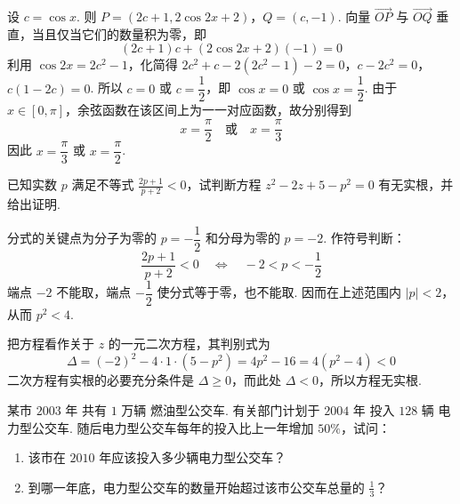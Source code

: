 \begin{solution}
设 \(c=\cos x\). 则
\(P=(2c+1,2\cos2x+2)\)，\(Q=(c,-1)\).
向量 \(\overrightarrow{OP}\) 与 \(\overrightarrow{OQ}\) 垂直，当且仅当它们的数量积为零，即
\[
(2c+1)c+(2\cos2x+2)(-1)=0
\]
利用 \(\cos2x=2c^2-1\)，化简得
\(2c^2+c-2(2c^2-1)-2=0\)，\(c-2c^2=0\)，\(c(1-2c)=0\).
所以 \(c=0\) 或 \(c=\dfrac{1}{2}\)，即 \(\cos x=0\) 或 \(\cos x=\dfrac{1}{2}\). 由于 \(x\in[0,\pi]\)，余弦函数在该区间上为一一对应函数，故分别得到
\[
x=\frac{\pi}{2}\quad\text{或}\quad x=\frac{\pi}{3}
\]
因此 \(x=\dfrac{\pi}{3}\) 或 \(x=\dfrac{\pi}{2}\).
\end{solution}

\begin{problem}
已知实数 \(p\) 满足不等式 \(\frac{2p+1}{p+2}<0\)，试判断方程 \(z^2-2z+5-p^2=0\) 有无实根，并给出证明.
\end{problem}

\begin{solution}
分式的关键点为分子为零的 \(p=-\dfrac{1}{2}\) 和分母为零的 \(p=-2\). 作符号判断：
\[
\frac{2p+1}{p+2}<0
\quad\Longleftrightarrow\quad
-2<p<-\frac{1}{2}
\]
端点 \(-2\) 不能取，端点 \(-\dfrac{1}{2}\) 使分式等于零，也不能取. 因而在上述范围内 \(|p|<2\)，从而 \(p^2<4\).

把方程看作关于 \(z\) 的一元二次方程，其判别式为
\[
\Delta=(-2)^2-4\cdot1\cdot(5-p^2)=4p^2-16=4(p^2-4)<0
\]
二次方程有实根的必要充分条件是 \(\Delta\geqslant0\)，而此处 \(\Delta<0\)，所以方程无实根.
\end{solution}

\begin{problem}
某市 \(2003\text{ 年}\) 共有 \(1\text{ 万辆}\) 燃油型公交车. 有关部门计划于 \(2004\text{ 年}\) 投入 \(128\text{ 辆}\) 电力型公交车. 随后电力型公交车每年的投入比上一年增加 \(50\%\)，试问：

\begin{enumerate}
\item 该市在 \(2010\) 年应该投入多少辆电力型公交车？
\item 到哪一年底，电力型公交车的数量开始超过该市公交车总量的 \(\frac{1}{3}\)？
\end{enumerate}
\end{problem}

